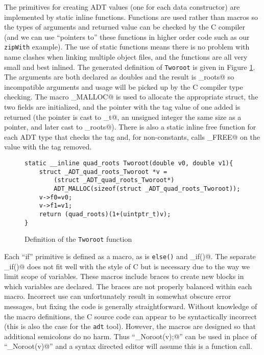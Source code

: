 The primitives for creating ADT values (one for each data constructor) are
implemented by static inline functions.  Functions are used rather than
macros so the types of arguments and returned value can be checked by
the C compiler (and we can use ``pointers to'' these functions
in higher order code such as our \texttt{zipWith} example).
The use of static functions means
there is no problem with name clashes when linking multiple object files,
and the functions are all very small and best inlined.  The generated
definition of \texttt{Tworoot} is given in Figure \ref{fig:Tworoot}.
The arguments are both
declared as doubles and the result is \verb@quad_roots@ so incompatible
arguments and usage will be picked up by the C compiler type checking.
The macro \verb@ADT_MALLOC@
is used to allocate the appropriate struct, the two fields
are initialized, and the pointer with the tag value of one added is
returned (the pointer is cast to \verb@uintptr_t@, an unsigned integer the
same size as a pointer, and later cast to \verb@quad_roots@).  There is
also a static inline free function for each ADT type that checks the
tag and, for non-constants, calls \verb@ADT_FREE@ on the value with the
tag removed.


\begin{figure}
\begin{verbatim}
static __inline quad_roots Tworoot(double v0, double v1){
    struct _ADT_quad_roots_Tworoot *v =
        (struct _ADT_quad_roots_Tworoot*)
        ADT_MALLOC(sizeof(struct _ADT_quad_roots_Tworoot));
    v->f0=v0;
    v->f1=v1;
    return (quad_roots)(1+(uintptr_t)v);
}
\end{verbatim}
\caption{Definition of the \texttt{Tworoot} function}
\label{fig:Tworoot}
\end{figure}


Each ``if'' primitive is defined as a macro, as is \texttt{else()}
and \verb@end_if()@.  The separate \verb@end_if()@ does not fit well
with the style of C but is necessary due to the way we limit scope
of variables.  These macros include braces to create new blocks in
which variables are declared.  The braces are not properly balanced
within each macro.  Incorrect use can unfortunately result in somewhat
obscure error messages, but fixing the code is generally straightforward.
Without knowledge of the macro definitions, the C source code can appear
to be syntactically incorrect (this is also the case for the
\texttt{adt} tool).  However, the macros are designed so
that additional semicolons do no harm.  Thus ``\verb@if_Noroot(v);@''
can be used in place of ``\verb@if_Noroot(v)@'' and a syntax directed
editor will assume this is a function call.

